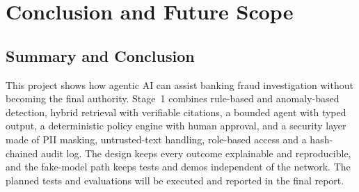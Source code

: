\documentclass[oneside,a4paper,12pt]{report}
\begin{document}
\chapter{Conclusion and Future Scope}
\section{Summary and Conclusion}
This project shows how agentic AI can assist banking fraud investigation without becoming the final authority. Stage~1 combines rule-based and anomaly-based detection, hybrid retrieval with verifiable citations, a bounded agent with typed output, a deterministic policy engine with human approval, and a security layer made of PII masking, untrusted-text handling, role-based access and a hash-chained audit log. The design keeps every outcome explainable and reproducible, and the fake-model path keeps tests and demos independent of the network. The planned tests and evaluations will be executed and reported in the final report.
\end{document}
